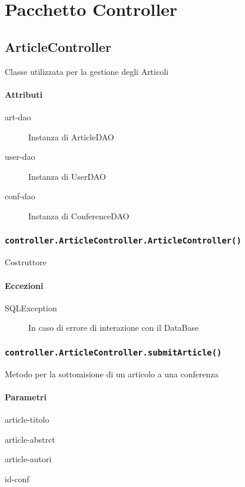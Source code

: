 \section{Pacchetto Controller}
\label{sec:package_controller}

\subsection{ArticleController}
Classe utilizzata per la gestione degli Articoli
\paragraph{Attributi}
\begin{description}
\item[art-dao] Instanza di ArticleDAO
\item[user-dao] Instanza di UserDAO
\item[conf-dao] Instanza di ConferenceDAO
\end{description}

\subsubsection{\texttt{controller.ArticleController.ArticleController()}}
Costruttore
\paragraph{Eccezioni}
\begin{description}
\item[SQLException] In caso di errore di interazione con il DataBase
\end{description}

\subsubsection{\texttt{controller.ArticleController.submitArticle()}}
Metodo per la sottomisione di un articolo a una conferenza
\paragraph{Parametri}
\begin{description}
\item article-titolo
\item article-abstrct
\item article-autori
\item id-conf
\end{description}
